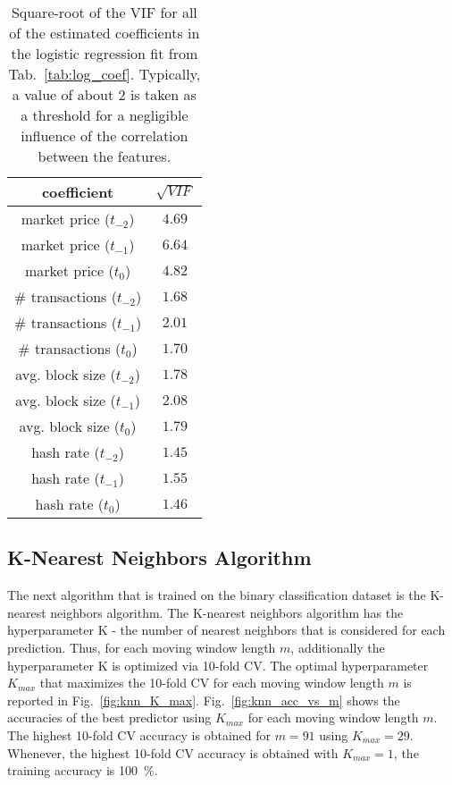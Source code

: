 \begin{table}[h!]
\centering
\begin{tabular}{c|c}
coefficient & $\sqrt{VIF}$ \\
 \hline
 \hline
 market price ($t_{-2}$) & $4.69$ \\   
 \hline
market price ($t_{-1}$) & $6.64$ \\
\hline
market price ($t_{0}$) & $4.82$ \\
\hline
\# transactions ($t_{-2}$) & $1.68$ \\
\hline
\# transactions ($t_{-1}$) & $2.01$ \\
\hline
\# transactions ($t_{0}$) & $1.70$ \\
\hline
avg. block size ($t_{-2}$) & $1.78$ \\
\hline
avg. block size ($t_{-1}$) & $2.08$ \\
\hline
avg. block size ($t_{0}$) & $1.79$\\
\hline
hash rate ($t_{-2}$) & $1.45$ \\
\hline
hash rate ($t_{-1}$) & $1.55$ \\
\hline
hash rate ($t_{0}$) & $1.46$ \\
\end{tabular}
 \caption{Square-root of the VIF for all of the estimated coefficients in the logistic regression fit from Tab.~\ref{tab:log_coef}. Typically, a value of about $2$ is taken as a threshold for a negligible influence of the correlation between the features.}
 \label{tab:log_vif}
\end{table}

\clearpage
\subsection{K-Nearest Neighbors Algorithm}
The next algorithm that is trained on the binary classification dataset is the K-nearest neighbors algorithm. The K-nearest neighbors algorithm has the hyperparameter K - the number of nearest neighbors that is considered for each prediction. Thus, for each moving window length $m$, additionally the hyperparameter K is optimized via 10-fold CV. The optimal hyperparameter $K_{max}$ that maximizes the 10-fold CV for each moving window length $m$ is reported in Fig.~\ref{fig:knn_K_max}. Fig.~\ref{fig:knn_acc_vs_m} shows the accuracies of the best predictor using $K_{max}$ for each moving window length $m$. The highest 10-fold CV accuracy is obtained for $m=91$ using $K_{max}=29$. Whenever, the highest 10-fold CV accuracy is obtained with $K_{max}=1$, the training accuracy is \SI{100}{\percent}.\\


